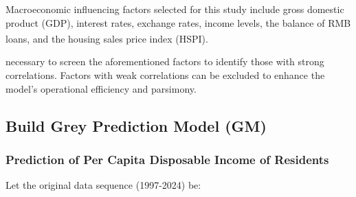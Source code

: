 \documentclass{mcmthesis}
\begin{document}
Macroeconomic influencing factors selected for this study include gross domestic product (GDP), 
interest rates, exchange rates, income levels, the balance of RMB loans, and the housing sales price index (HSPI)\textsuperscript{\cite{3}}.

necessary to screen the aforementioned factors to identify those with strong correlations. 
Factors with weak correlations can be excluded to enhance the model's operational efficiency and parsimony.

\subsection{Build Grey Prediction Model (GM)} %

\subsubsection{Prediction of Per Capita Disposable Income of Residents} %


Let the original data sequence (1997-2024) be:

\end{document}
